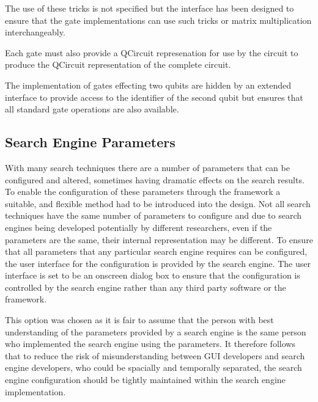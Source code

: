 The use of these tricks is not specified but the interface has been designed to ensure that the gate implementations can use such tricks or matrix multiplication interchangeably.

Each gate must also provide a QCircuit represenation for use by the circuit to produce the QCircuit representation of the complete circuit.

The implementation of gates effecting two qubits are hidden by an extended interface to provide access to the identifier of the second qubit but ensures that all standard gate operations are also available.

% 
% 

\subsection{Search Engine Parameters}
With many search techniques there are a number of parameters that can be configured and altered, sometimes having dramatic effects on the search results.
To enable the configuration of these parameters through the framework a suitable, and flexible method had to be introduced into the design.
Not all search techniques have the same number of parameters to configure and due to search engines being developed potentially by different researchers, even if the parameters are the same, their internal representation may be different.
To ensure that all parameters that any particular search engine requires can be configured, the user interface for the configuration is provided by the search engine.
The user interface is set to be an onscreen dialog box to ensure that the configuration is controlled by the search engine rather than any third party software or the framework.

This option was chosen as it is fair to assume that the person with best understanding of the parameters provided by a search engine is the same person who implemented the search engine using the parameters.
It therefore follows that to reduce the risk of misunderstanding between GUI developers and search engine developers, who could be spacially and temporally separated, the search engine configuration should be tightly maintained within the search engine implementation.

